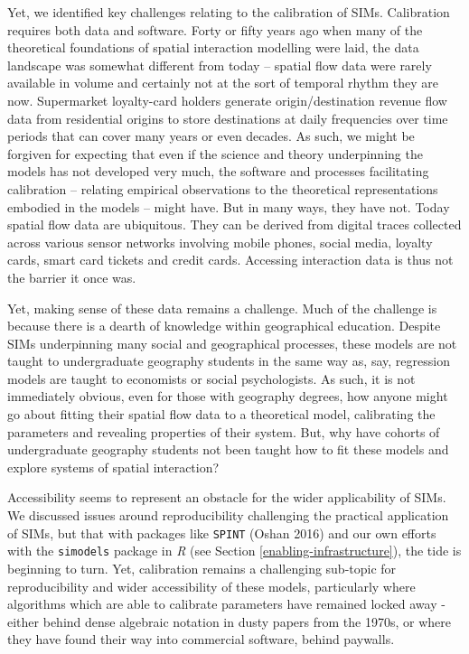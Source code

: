 \documentclass[11pt,letterpaper]{article}
\begin{document}
Yet, we identified key challenges relating to the calibration of SIMs.
Calibration requires both data and software.
Forty or fifty years ago when many of the theoretical foundations of spatial interaction modelling were laid, the data landscape was somewhat different from today -- spatial flow data were rarely available in volume and certainly not at the sort of temporal rhythm they are now.
Supermarket loyalty-card holders generate origin/destination revenue flow data from residential origins to store destinations at daily frequencies over time periods that can cover many years or even decades.
As such, we might be forgiven for expecting that even if the science and theory underpinning the models has not developed very much, the software and processes facilitating calibration -- relating empirical observations to the theoretical representations embodied in the models -- might have.
But in many ways, they have not.
Today spatial flow data are ubiquitous.
They can be derived from digital traces collected across various sensor networks involving mobile phones, social media, loyalty cards, smart card tickets and credit cards.
Accessing interaction data is thus not the barrier it once was.

Yet, making sense of these data remains a challenge.
Much of the challenge is because there is a dearth of knowledge within geographical education.
Despite SIMs underpinning many social and geographical processes, these models are not taught to undergraduate geography students in the same way as, say, regression models are taught to economists or social psychologists.
As such, it is not immediately obvious, even for those with geography degrees, how anyone might go about fitting their spatial flow data to a theoretical model, calibrating the parameters and revealing properties of their system.
But, why have cohorts of undergraduate geography students not been taught how to fit these models and explore systems of spatial interaction?

Accessibility seems to represent an obstacle for the wider applicability of SIMs.
We discussed issues around reproducibility challenging the practical application of SIMs, but that with packages like \texttt{SPINT} (Oshan 2016) and our own efforts with the \texttt{simodels} package in \emph{R} (see Section \ref{enabling-infrastructure}), the tide is beginning to turn.
Yet, calibration remains a challenging sub-topic for reproducibility and wider accessibility of these models, particularly where algorithms which are able to calibrate parameters have remained locked away - either behind dense algebraic notation in dusty papers from the 1970s, or where they have found their way into commercial software, behind paywalls.
\end{document}
